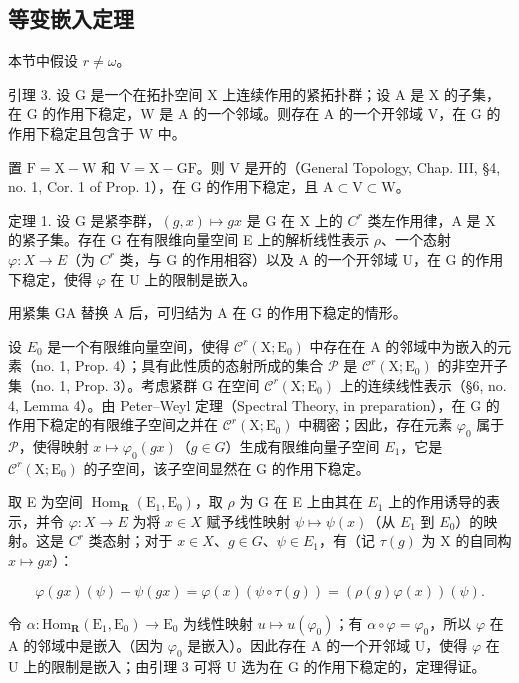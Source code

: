 \subsection{等变嵌入定理}

本节中假设 \(r \neq \omega\)。

引理 3. 设 G 是一个在拓扑空间 X 上连续作用的紧拓扑群；设 A 是 X 的子集，在 G 的作用下稳定，W 是 A 的一个邻域。则存在 A 的一个开邻域 V，在 G 的作用下稳定且包含于 W 中。

置 \(\mathrm{F} = \mathrm{X} - \mathrm{W}\) 和 \(\mathrm{V} = \mathrm{X} - \mathrm{GF}\)。则 \(\mathrm{V}\) 是开的（General Topology, Chap. III, §4, no. 1, Cor. 1 of Prop. 1），在 \(\mathrm{G}\) 的作用下稳定，且 \(\mathrm{A} \subset \mathrm{V} \subset \mathrm{W}\)。

定理 1. 设 G 是紧李群，\((g,x)\mapsto gx\) 是 G 在 X 上的 \(C^{r}\) 类左作用律，A 是 X 的紧子集。存在 G 在有限维向量空间 E 上的解析线性表示 \(\rho\)、一个态射 \(\varphi:X\to E\)（为 \(C^{r}\) 类，与 G 的作用相容）以及 A 的一个开邻域 U，在 G 的作用下稳定，使得 \(\varphi\) 在 U 上的限制是嵌入。

用紧集 GA 替换 A 后，可归结为 A 在 G 的作用下稳定的情形。

设 \(E_0\) 是一个有限维向量空间，使得 \(\mathcal{C}^r(\mathrm{X};\mathrm{E}_0)\) 中存在在 A 的邻域中为嵌入的元素（no. 1, Prop. 4）；具有此性质的态射所成的集合 \(\mathcal{P}\) 是 \(\mathcal{C}^r(\mathrm{X};\mathrm{E}_0)\) 的非空开子集（no. 1, Prop. 3）。考虑紧群 G 在空间 \(\mathcal{C}^r(\mathrm{X};\mathrm{E}_0)\) 上的连续线性表示（§6, no. 4, Lemma 4）。由 Peter–Weyl 定理（Spectral Theory, in preparation），在 G 的作用下稳定的有限维子空间之并在 \(\mathcal{C}^r(\mathrm{X};\mathrm{E}_0)\) 中稠密；因此，存在元素 \(\varphi_0\) 属于 \(\mathcal{P}\)，使得映射 \(x \mapsto \varphi_0(gx)\)（\(g \in G\)）生成有限维向量子空间 \(E_1\)，它是 \(\mathcal{C}^r(\mathrm{X};\mathrm{E}_0)\) 的子空间，该子空间显然在 G 的作用下稳定。

取 E 为空间 \(\operatorname{Hom}_{\mathbf{R}}(\mathrm{E}_{1},\mathrm{E}_{0})\)，取 \(\rho\) 为 G 在 E 上由其在 \(E_{1}\) 上的作用诱导的表示，并令 \(\varphi:X\to E\) 为将 \(x\in X\) 赋予线性映射 \(\psi\mapsto\psi(x)\)（从 \(E_{1}\) 到 \(E_{0}\)）的映射。这是 \(C^{r}\) 类态射；对于 \(x\in X\)、\(g\in G\)、\(\psi\in E_{1}\)，有（记 \(\tau(g)\) 为 X 的自同构 \(x\mapsto gx\)）：

\[
\varphi (g x) (\psi) - \psi (g x) = \varphi (x) (\psi \circ \tau (g)) = (\rho (g) \varphi (x)) (\psi).
\]

令 \(\alpha : \mathrm{Hom}_{\mathbf{R}}(\mathrm{E}_1, \mathrm{E}_0) \to \mathrm{E}_0\) 为线性映射 \(u \mapsto u(\varphi_0)\)；有 \(\alpha \circ \varphi = \varphi_0\)，所以 \(\varphi\) 在 A 的邻域中是嵌入（因为 \(\varphi_0\) 是嵌入）。因此存在 A 的一个开邻域 U，使得 \(\varphi\) 在 U 上的限制是嵌入；由引理 3 可将 U 选为在 G 的作用下稳定的，定理得证。

